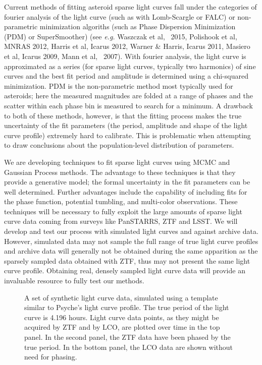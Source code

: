 \documentclass[11pt]{article}
\begin{document}
Current methods of fitting asteroid sparse light curves fall under the categories of
fourier analysis of the light curve (such as with Lomb-Scargle or FALC) or non-parametric
minimization algoriths (such as Phase Dispersion Minimization (PDM) or SuperSmoother)  
(see {\it e.g.} Waszczak et al, \aj\, 2015, Polishook et al,
MNRAS 2012, Harris et al, Icarus 2012, Warner \& Harris, Icarus 2011,
Masiero et al, Icarus 2009, Mann et al, \aj\, 2007).  With fourier analysis, the 
light curve is approximated as a series (for sparse light curves, typically two harmonics)
of sine curves and the best fit period and amplitude is determined using a chi-squared minimization. 
PDM is the non-parametric method most typically used for asteroids; here the measured magnitudes
are folded at a range of phases and the scatter within each phase bin is measured to search for 
a minimum. A drawback to both of these methods, however, is that the fitting process makes the true 
uncertainty of the fit parameters (the period, amplitude and shape of the light curve profile) extremely hard
to calibrate. This is problematic when attempting to draw conclusions about the population-level distribution
of parameters.

We are developing techniques to fit sparse light curves using MCMC and Gaussian Process
methods. The advantage to these techniques is that they provide a generative model;
the formal uncertainty in the fit parameters can be well determined. Further advantages
include the capability of including fits for the phase function, potential tumbling, 
and multi-color observations. These techniques will be necessary to fully
exploit the large amounts of sparse light curve data coming from surveys like
PanSTARRS, ZTF and LSST. We will develop and test our process with simulated light curves and against 
archive data. However, simulated data may not sample the full range
of true light curve profiles and archive data will generally not be obtained
during the same apparition as the sparsely sampled data obtained with ZTF, thus may
not present the same light curve profile. Obtaining real, densely sampled
light curve data will provide an invaluable resource to fully test our methods.

\begin{figure}[hbt]
\caption{A set of synthetic light curve data, simulated using a template similar to Psyche's light curve profile. The true period of the light curve is 4.196 hours. Light curve data points, as they might be acquired by ZTF and by LCO, are plotted over time in the top panel. In the second panel, the ZTF data have been phased by the true period. In the bottom panel, the LCO data are shown without need for phasing.}
\end{figure}
\end{document}
